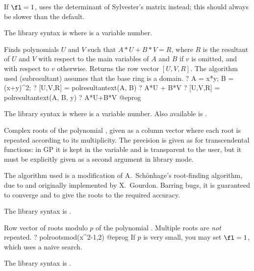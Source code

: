 If $\fl=1$, uses the determinant of Sylvester's matrix instead; this should
always be slower than the default.

The library syntax is  where  is a variable number.

\label{se:polresultantext}
Finds polynomials $U$ and $V$ such that $A*U + B*V = R$, where $R$ is
the resultant of $U$ and $V$ with respect to the main variables of $A$ and
$B$ if $v$ is omitted, and with respect to $v$ otherwise. Returns the row
vector $[U,V,R]$. The algorithm used (subresultant) assumes that the base
ring is a domain.
\bprog
? A = x*y; B = (x+y)^2;
? [U,V,R] = polresultantext(A, B)
? A*U + B*V
? [U,V,R] = polresultantext(A, B, y)
? A*U+B*V
@eprog

The library syntax is  where  is a variable number.
Also available is
.

\label{se:polroots}
Complex roots of the polynomial
, given as a column vector where each root is repeated according to
its multiplicity. The precision is given as for transcendental functions: in
GP it is kept in the variable  and is transparent to the
user, but it must be explicitly given as a second argument in library mode.

The algorithm used is a modification of A.~Sch\"onhage's
root-finding algorithm, due to and originally implemented by X.~Gourdon.
Barring bugs, it is guaranteed to converge and to give the roots to the
required accuracy.

The library syntax is .

\label{se:polrootsmod}
Row vector of roots modulo $p$ of the polynomial .
Multiple roots are \emph{not} repeated.
\bprog
? polrootsmod(x^2-1,2)
@eprog\noindent
If $p$ is very small, you may set $\fl=1$, which uses a naive search.

The library syntax is .

